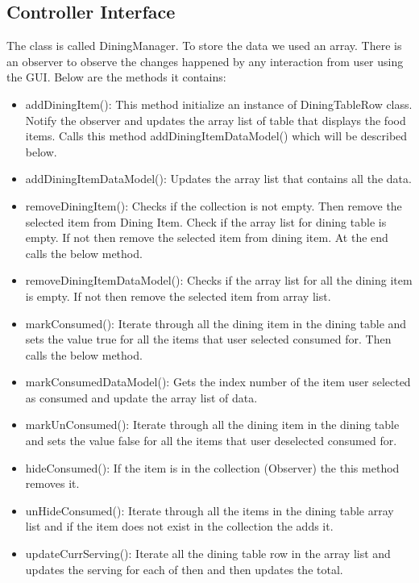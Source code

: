 \documentclass{scrreprt}
\begin{document}
\subsection{Controller Interface}

The class is called DiningManager. To store the data we used an array. There is an observer to observe the changes happened by any interaction from user using the GUI. Below are the methods it contains:

\begin{itemize}
	\item addDiningItem(): This method initialize an instance of DiningTableRow class. Notify the observer and updates the array list of table that displays the food items. Calls this method addDiningItemDataModel() which will be described below.
	\item addDiningItemDataModel(): Updates the array list that contains all the data.
	\item removeDiningItem(): Checks if the collection is not empty. Then remove the selected item from Dining Item. Check if the array list for dining table is empty. If not then remove the selected item from dining item. At the end calls the below method.
	\item removeDiningItemDataModel(): Checks if the array list for all the dining item is empty. If not then remove the selected item from array list.
	\item markConsumed(): Iterate through all the dining item in the dining table and sets the value true for all the items that user selected consumed for. Then calls the below method.
	\item markConsumedDataModel(): Gets the index number of the item user selected as consumed and update the array list of data.
	\item markUnConsumed(): Iterate through all the dining item in the dining table and sets the value false for all the items that user deselected consumed for.
	\item hideConsumed(): If the item is in the collection (Observer) the this method removes it.
	\item unHideConsumed(): Iterate through all the items in the dining table array list and if the item does not exist in the collection the adds it.
	\item updateCurrServing(): Iterate all the dining table row in the array list and updates the serving for each of then and then updates the total.
\end{itemize}
\end{document}
